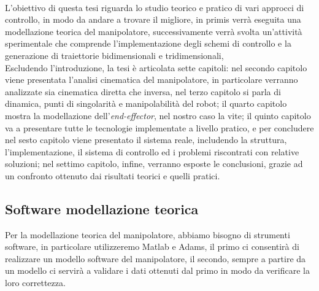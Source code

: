 \\L'obiettivo di questa tesi riguarda lo studio teorico e pratico di vari approcci di controllo, in modo da andare a trovare il migliore, in primis verrà eseguita una modellazione teorica del manipolatore, successivamente verrà svolta un'attività sperimentale che comprende l'implementazione degli schemi di controllo e la generazione di traiettorie bidimensionali e tridimensionali,
\\Escludendo l'introduzione, la tesi è articolata sette capitoli: nel secondo capitolo viene presentata l'analisi cinematica del manipolatore, in particolare verranno analizzate sia cinematica diretta che inversa, nel terzo capitolo si parla di dinamica, punti di singolarità e manipolabilità del robot; il quarto capitolo mostra la modellazione dell'\textit{end-effector}, nel nostro caso la vite; il quinto capitolo va a presentare tutte le tecnologie implementate a livello pratico, e per concludere nel sesto capitolo viene presentato il sistema reale, includendo la struttura, l'implementazione, il sistema di controllo ed i problemi riscontrati con relative soluzioni; nel settimo capitolo, infine, verranno esposte le conclusioni, grazie ad un confronto ottenuto dai risultati teorici e quelli pratici.
\subsection{Software modellazione teorica}
Per la modellazione teorica del manipolatore, abbiamo bisogno di strumenti software, in particolare utilizzeremo Matlab e Adams, il primo ci consentirà di realizzare un modello software del manipolatore, il secondo, sempre a partire da un modello ci servirà a validare i dati ottenuti dal primo in modo da verificare la loro correttezza.
